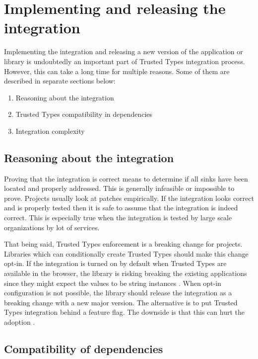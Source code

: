 \section{Implementing and releasing the integration}

Implementing the integration and releasing a new version of the application or library is
undoubtedly an important part of Trusted Types integration process. However, this can take a long
time for multiple reasons. Some of them are described in separate sections below:

\begin{enumerate}
  \item Reasoning about the integration
  \item Trusted Types compatibility in dependencies
  \item Integration complexity
\end{enumerate}

\subsection{Reasoning about the integration}
\label{sub:reason_about_integration}

Proving that the integration is correct means to determine if all sinks have been located and
properly addressed. This is generally infeasible or impossible to prove. Projects usually look at
patches empirically. If the integration looks correct and is properly tested then it is safe to
assume that the integration is indeed correct. This is especially true when the integration is
tested by large scale organizations by lot of services.

That being said, Trusted Types enforcement is a breaking change for projects. Libraries which can
conditionally create Trusted Types should make this change opt-in. If the integration is turned on
by default when Trusted Types are available in the browser, the library is risking breaking the
existing applications since they might expect the values to be string instances
\cite{dom_purify_breakage}. When opt-in configuration is not possible, the library should release
the integration as a breaking change with a new major version. The alternative is to put Trusted
Types integration behind a feature flag. The downside is that this can hurt the adoption
\cite{react_tt_feature_flag}.

\subsection{Compatibility of dependencies}
\label{sub:tt_compatibility_in_deps}

